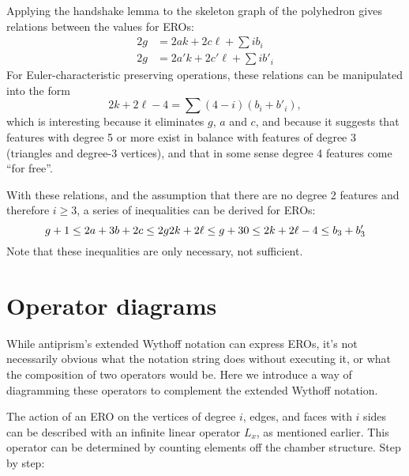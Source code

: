 \documentclass{amsart}[12pt]
\begin{document}
Applying the handshake lemma to the skeleton graph of the polyhedron gives
relations between the values for EROs:
\begin{equation}
  \begin{split}
   2g &= 2ak + 2c\ell + \sum i b_i \\
   2g &= 2a'k + 2c'\ell + \sum i b'_i
 \end{split}
\end{equation}
For Euler-characteristic preserving operations, these relations can be
manipulated into the form
\begin{equation}
  2k + 2\ell - 4 = \sum (4-i) (b_i + b'_i),
\end{equation}
which is interesting because it eliminates $g$, $a$ and $c$,
and because it suggests that features with degree 5 or more exist
in balance with features of degree 3 (triangles and degree-3 vertices),
and that in some sense degree 4 features come ``for free''.

With these relations, and the assumption that there are no degree 2 features
and therefore $i \ge 3$, a series of inequalities can be derived for EROs:
\begin{equation}
  g + 1 \le 2a + 3b + 2c \le 2g \\
  2k + 2\ell \le g + 3 \\
  0 \le 2k + 2\ell - 4 \le b_3 + b'_3 \\
\end{equation}
Note that these inequalities are only necessary, not sufficient.

\section{Operator diagrams}

While antiprism's extended Wythoff notation can express EROs, it's not
necessarily obvious what the notation string does without executing it, or
what the composition of two operators would be. Here we introduce a way of
diagramming these operators to complement the extended Wythoff notation.

The action of an ERO on the vertices of degree $i$, edges, and faces with
$i$ sides can be described with an infinite linear operator $L_x$, as mentioned
earlier. This operator can be determined by counting elements off the chamber
structure. Step by step:
\end{document}
